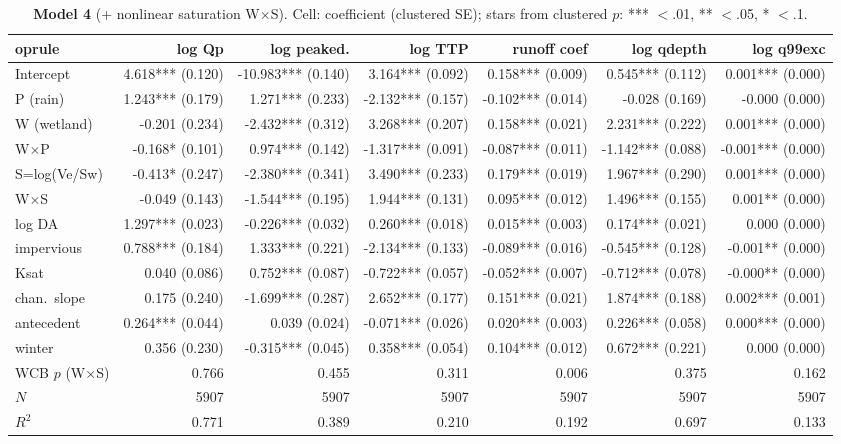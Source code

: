 \documentclass[10pt]{article}
\begin{document}
\begin{landscape}\begin{table}[htbp]\centering
\caption{\textbf{Model 4} (+ nonlinear saturation W$\times$S). Cell: coefficient (clustered SE); stars from clustered $p$: *** $<$.01, ** $<$.05, * $<$.1.}
\scriptsize\begin{tabular}{lrrrrrr}	oprule
 & \textbf{log Qp} & \textbf{log peaked.} & \textbf{log TTP} & \textbf{runoff coef} & \textbf{log qdepth} & \textbf{log q99exc} \\ \midrule
Intercept & 4.618*** (0.120) & -10.983*** (0.140) & 3.164*** (0.092) & 0.158*** (0.009) & 0.545*** (0.112) & 0.001*** (0.000) \\
P (rain) & 1.243*** (0.179) & 1.271*** (0.233) & -2.132*** (0.157) & -0.102*** (0.014) & -0.028 (0.169) & -0.000 (0.000) \\
W (wetland) & -0.201 (0.234) & -2.432*** (0.312) & 3.268*** (0.207) & 0.158*** (0.021) & 2.231*** (0.222) & 0.001*** (0.000) \\
W$\times$P & -0.168* (0.101) & 0.974*** (0.142) & -1.317*** (0.091) & -0.087*** (0.011) & -1.142*** (0.088) & -0.001*** (0.000) \\
S=log(Ve/Sw) & -0.413* (0.247) & -2.380*** (0.341) & 3.490*** (0.233) & 0.179*** (0.019) & 1.967*** (0.290) & 0.001*** (0.000) \\
W$\times$S & -0.049 (0.143) & -1.544*** (0.195) & 1.944*** (0.131) & 0.095*** (0.012) & 1.496*** (0.155) & 0.001** (0.000) \\
log DA & 1.297*** (0.023) & -0.226*** (0.032) & 0.260*** (0.018) & 0.015*** (0.003) & 0.174*** (0.021) & 0.000 (0.000) \\
impervious & 0.788*** (0.184) & 1.333*** (0.221) & -2.134*** (0.133) & -0.089*** (0.016) & -0.545*** (0.128) & -0.001** (0.000) \\
Ksat & 0.040 (0.086) & 0.752*** (0.087) & -0.722*** (0.057) & -0.052*** (0.007) & -0.712*** (0.078) & -0.000** (0.000) \\
chan.\ slope & 0.175 (0.240) & -1.699*** (0.287) & 2.652*** (0.177) & 0.151*** (0.021) & 1.874*** (0.188) & 0.002*** (0.001) \\
antecedent & 0.264*** (0.044) & 0.039 (0.024) & -0.071*** (0.026) & 0.020*** (0.003) & 0.226*** (0.058) & 0.000*** (0.000) \\
winter & 0.356 (0.230) & -0.315*** (0.045) & 0.358*** (0.054) & 0.104*** (0.012) & 0.672*** (0.221) & 0.000 (0.000) \\
\midrule
WCB $p$ (W$\times$S) & 0.766 & 0.455 & 0.311 & 0.006 & 0.375 & 0.162 \\
$N$ & 5907 & 5907 & 5907 & 5907 & 5907 & 5907 \\
$R^2$ & 0.771 & 0.389 & 0.210 & 0.192 & 0.697 & 0.133 \\
\bottomrule\end{tabular}
\end{table}\end{landscape}
\end{document}
